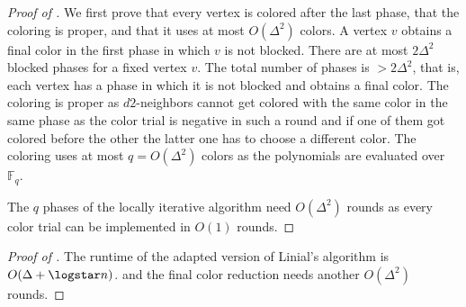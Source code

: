 \begin{proof}[Proof of ]
We first prove that every vertex is colored after the last phase, that the coloring is proper, and that it uses at most $O(\Delta^2)$ colors. 
A vertex $v$ obtains a final color in the first phase in which $v$ is not blocked. There are at most $2\Delta^2$ blocked phases for a fixed vertex $v$. The total number of phases is $>2\Delta^2$, that is, each vertex has a phase in which it is not blocked and obtains a final color. The coloring is proper as $d2$-neighbors cannot get colored with the same color in the same phase as the color trial is negative in such a round and if one of them got colored before the other the latter one has to choose a different color. The coloring uses at most $q=O(\Delta^2)$ colors as the polynomials are evaluated over $\mathbb{F}_q$. 

The $q$ phases of the locally iterative algorithm need $O(\Delta^2)$ rounds as every color trial can be implemented in $O(1)$ rounds.
\end{proof}

\begin{proof}[Proof of ]
The runtime of the adapted version of Linial's algorithm is $O(\Delta+\logstar n)$.  and the final color reduction needs another $O(\Delta^2)$ rounds.
\end{proof}






